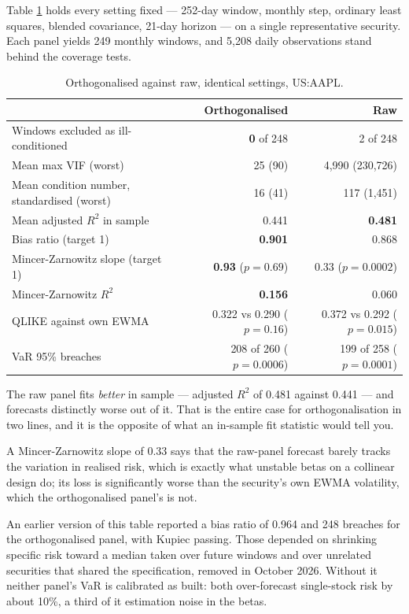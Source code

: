 \documentclass[11pt,a4paper]{article}
\begin{document}
Table \ref{tab:oos} holds every setting fixed --- 252-day window, monthly step,
ordinary least squares, blended covariance, 21-day horizon --- on a single
representative security. Each panel yields 249 monthly windows, and 5{,}208 daily
observations stand behind the coverage tests.

\begin{table}[htbp]
\centering
\caption{Orthogonalised against raw, identical settings, US:AAPL.}
\label{tab:oos}
\small
\begin{tabular}{@{}lrr@{}}
\toprule
 & \textbf{Orthogonalised} & \textbf{Raw} \\
\midrule
Windows excluded as ill-conditioned & \textbf{0} of 248 & 2 of 248 \\
Mean max VIF (worst) & 25 (90) & 4{,}990 (230{,}726) \\
Mean condition number, standardised (worst) & 16 (41) & 117 (1{,}451) \\
Mean adjusted $R^2$ in sample & 0.441 & \textbf{0.481} \\
Bias ratio (target 1) & \textbf{0.901} & 0.868 \\
Mincer-Zarnowitz slope (target 1) & \textbf{0.93} ($p=0.69$) & 0.33 ($p=0.0002$) \\
Mincer-Zarnowitz $R^2$ & \textbf{0.156} & 0.060 \\
QLIKE against own EWMA & 0.322 vs 0.290 ($p=0.16$) & 0.372 vs 0.292 ($p=0.015$) \\
VaR 95\% breaches & 208 of 260 ($p=0.0006$) & 199 of 258 ($p=0.0001$) \\
\bottomrule
\end{tabular}
\end{table}

The raw panel fits \emph{better} in sample --- adjusted $R^2$ of 0.481 against 0.441
--- and forecasts distinctly worse out of it. That is the entire case for
orthogonalisation in two lines, and it is the opposite of what an in-sample fit
statistic would tell you.

A Mincer-Zarnowitz slope of 0.33 says that the raw-panel forecast barely tracks the
variation in realised risk, which is exactly what unstable betas on a collinear
design do; its loss is significantly worse than the security's own EWMA volatility,
which the orthogonalised panel's is not.

An earlier version of this table reported a bias ratio of 0.964 and 248 breaches for
the orthogonalised panel, with Kupiec passing. Those depended on shrinking specific
risk toward a median taken over future windows and over unrelated securities that
shared the specification, removed in October 2026. Without it neither panel's VaR
is calibrated as built: both over-forecast single-stock risk by about 10\%, a third
of it estimation noise in the betas.
\end{document}
